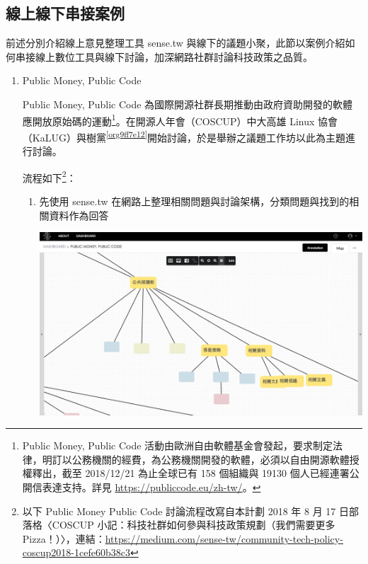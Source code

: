 \documentclass[12pt,a4paper]{article}
\begin{document}
\subsection{線上線下串接案例 }
\label{sec:org261a364}
前述分別介紹線上意見整理工具 sense.tw 與線下的議題小聚，此節以案例介紹如何串接線上數位工具與線下討論，加深網路社群討論科技政策之品質。
\begin{enumerate}
\item Public Money, Public Code
\label{sec:orgc3bb790}

Public Money, Public Code 為國際開源社群長期推動由政府資助開發的軟體應開放原始碼的運動\footnote{Public Money, Public Code 活動由歐洲自由軟體基金會發起，要求制定法律，明訂以公務機關的經費，為公務機關開發的軟體，必須以自由開源軟體授權釋出，截至 2018/12/21 為止全球已有 158 個組織與 19130 個人已經連署公開信表達支持。詳見 \url{https://publiccode.eu/zh-tw/}。}。在開源人年會（COSCUP）中大高雄 Linux 協會（KaLUG）與樹黨\textsuperscript{\ref{org9ff7e12}}開始討論，於是舉辦之議題工作坊以此為主題進行討論。

流程如下\footnote{以下 Public Money Public Code 討論流程改寫自本計劃 2018 年 8 月 17 日部落格〈COSCUP 小記：科技社群如何參與科技政策規劃（我們需要更多 Pizza！）〉，連結：\url{https://medium.com/sense-tw/community-tech-policy-coscup2018-1cefe60b38c3}}：

\begin{enumerate}
\item 先使用 sense.tw 在網路上整理相關問題與討論架構，分類問題與找到的相關資料作為回答
\begin{center}
\includegraphics[width=.9\linewidth]{./images/pmpc2.png}
\end{center}


\end{enumerate}
\end{enumerate}
\end{document}
